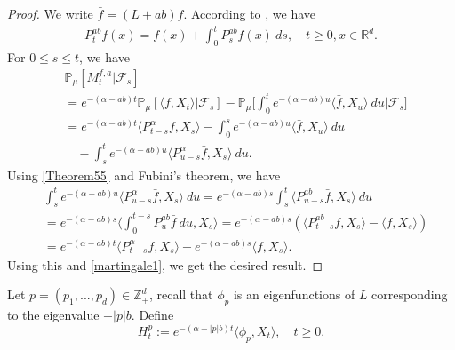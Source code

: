 \documentclass[12pt,a4paper]{amsart}
\theoremstyle{plain}
\theoremstyle{definition}
\numberwithin{equation}{section}
\begin{document}
\begin{proof}
    We write $\bar{f}=(L+ab)f$. According to \cite[Theorem A.55]{Li2011Measure-valued}, we have
\begin{equation}\begin{split}\label{Theorem55}
    P_t^{ab}f(x)= f(x)+\int_0^t P_s^{ab}\bar{f}(x)~ds,\quad t\geq 0,x\in \mathbb R^d.
\end{split}\end{equation}
    For $0\leq s\leq t$, we have
\begin{equation}\begin{split}
\label{martingale1}
    &\mathbb{P}_{\mu}[M_t^{f,a}|\mathscr{F}_s]
    \\&=e^{-(\alpha-ab)t}\mathbb{P}_{\mu}\left[\langle f,X_t\rangle|\mathscr{F}_s\right]-\mathbb{P}_{\mu}\Big[\int_0^t e^{-(\alpha-ab)u}\langle \bar{f}, X_u\rangle~ du\Big|\mathscr{F}_s\big]
    \\&=e^{-(\alpha-ab)t}\langle P_{t-s}^{\alpha}f, X_s\rangle-\int_0^s e^{-(\alpha-ab)u}\langle \bar{f}, X_u\rangle~ du
    \\&\quad -\int_s^t e^{-(\alpha-ab)u}\langle P_{u-s}^{\alpha} \bar{f},X_s\rangle~ du.
\end{split}\end{equation}
    Using \eqref{Theorem55} and Fubini's theorem, we have
\begin{equation}\begin{split}
    &\int_s^t e^{-(\alpha-ab)u}\langle P_{u-s}^{\alpha} \bar{f},X_s\rangle~ du=e^{-(\alpha-ab)s}\int_s^t\langle P_{u-s}^{ab}\bar{f},X_s\rangle~du\\
    &=e^{-(\alpha-ab)s}\Big\langle\int_0^{t-s}P_{u}^{ab}\bar{f}~du,X_s\Big\rangle=e^{-(\alpha-ab)s}\left(\langle P_{t-s}^{ab}f,X_s\rangle-\langle
    f,X_s\rangle\right)\\
    &=e^{-(\alpha-ab)t}\langle P_{t-s}^{\alpha}f, X_s\rangle-e^{-(\alpha-ab)s}\langle
    f,X_s\rangle.
\end{split}\end{equation}
    Using this and \eqref{martingale1}, we get the desired result.
\end{proof}

    Let $p=(p_1,...,p_d)\in \mathbb Z_+^d$, recall that $\phi_p$ is an eigenfunctions of $L$ corresponding to the eigenvalue $-|p|b$. Define
\[
    H_t^p
    :=e^{-(\alpha-|p|b)t}\langle\phi_p,X_t\rangle, \quad t\geq 0.
\]
\end{document}
